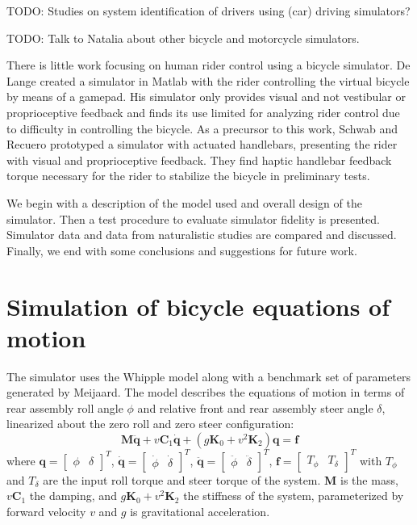 \documentclass[11pt,a4paper,reqno]{amsart}
\newcommand{\damping}{v \bm{C}_1}
\newcommand{\stiffness}{g \bm{K}_0 + v^2 \bm{K}_2}
\begin{document}
TODO: Studies on system identification of drivers using (car) driving simulators?

TODO: Talk to Natalia about other bicycle and motorcycle simulators.

There is little work focusing on human rider control using a bicycle simulator.
De Lange created a simulator in Matlab with the rider controlling the virtual bicycle by means of a
gamepad\cite{delange2011}.
His simulator only provides visual and not vestibular or proprioceptive feedback and finds its use limited for
analyzing rider control due to difficulty in controlling the bicycle.
As a precursor to this work, Schwab and Recuero prototyped a simulator with actuated handlebars\cite{schwab2013},
presenting the rider with visual and proprioceptive feedback.
They find haptic handlebar feedback torque necessary for the rider to stabilize the bicycle in preliminary tests.

We begin with a description of the model used and overall design of the simulator.
Then a test procedure to evaluate simulator fidelity is presented.
Simulator data and data from naturalistic studies are compared and discussed.
Finally, we end with some conclusions and suggestions for future work.

\section{Simulation of bicycle equations of motion}
The simulator uses the Whipple model\cite{whipple1899} along with a benchmark set of parameters generated by
Meijaard\cite{meijaard2007}.
The model describes the equations of motion in terms of rear assembly roll angle $\phi$ and relative front and rear
assembly steer angle $\delta$, linearized about the zero roll and zero steer configuration:
\begin{equation}
    \bm{M \ddot{q}} + \damping \dot{\bm{q}} + (\stiffness) \bm{q} = \bm{f} \label{eq:eom}
\end{equation}
where
$ \bm{q} = \begin{bmatrix} \phi & \delta \end{bmatrix}^T $,
$ \dot{\bm{q}} = \begin{bmatrix} \dot{\phi} & \dot{\delta} \end{bmatrix}^T $,
$ \ddot{\bm{q}} = \begin{bmatrix} \ddot{\phi} & \ddot{\delta} \end{bmatrix}^T $,
$ \bm{f} = \begin{bmatrix} T_\phi & T_\delta \end{bmatrix}^T $ with $ T_\phi $ and $ T_\delta $ are the input roll
torque and steer torque of the system.
$ \bm{M} $ is the mass, $ \damping $ the damping, and $ \stiffness $ the stiffness of the system,
parameterized by forward velocity $ v $ and $ g $ is gravitational acceleration.
\end{document}
